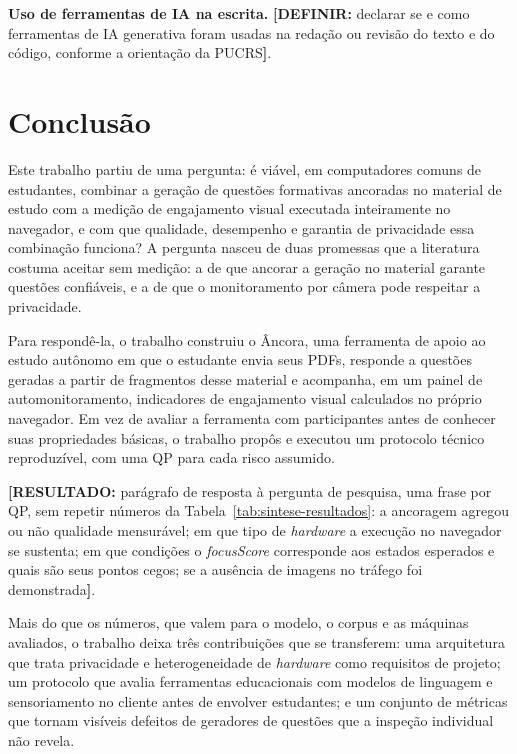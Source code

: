\documentclass[portuguese,oneside]{tcc}
\newcommand{\ferramenta}{Âncora\xspace}
\newcommand{\estr}[1]{\emph{#1}}
\newcommand{\fs}{\emph{focusScore}\xspace}
\newcommand{\resultado}[1]{\textcolor{red!70!black}{\textbf{[RESULTADO:} #1\textbf{]}}}
\newcommand{\definir}[1]{\textcolor{orange!75!black}{\textbf{[DEFINIR:} #1\textbf{]}}}
\begin{document}
\textbf{Uso de ferramentas de IA na escrita.} \definir{declarar se e como ferramentas de IA generativa foram usadas na redação ou revisão do texto e do código, conforme a orientação da PUCRS}.

\chapter{\label{chap:conclusao}Conclusão}

Este trabalho partiu de uma pergunta: é viável, em computadores comuns de estudantes, combinar a geração de questões formativas ancoradas no material de estudo com a medição de engajamento visual executada inteiramente no navegador, e com que qualidade, desempenho e garantia de privacidade essa combinação funciona? A pergunta nasceu de duas promessas que a literatura costuma aceitar sem medição: a de que ancorar a geração no material garante questões confiáveis, e a de que o monitoramento por câmera pode respeitar a privacidade.

Para respondê-la, o trabalho construiu o \ferramenta, uma ferramenta de apoio ao estudo autônomo em que o estudante envia seus PDFs, responde a questões geradas a partir de fragmentos desse material e acompanha, em um painel de automonitoramento, indicadores de engajamento visual calculados no próprio navegador. Em vez de avaliar a ferramenta com participantes antes de conhecer suas propriedades básicas, o trabalho propôs e executou um protocolo técnico reproduzível, com uma QP para cada risco assumido.

\resultado{parágrafo de resposta à pergunta de pesquisa, uma frase por QP, sem repetir números da Tabela~\ref{tab:sintese-resultados}: a ancoragem agregou ou não qualidade mensurável; em que tipo de \estr{hardware} a execução no navegador se sustenta; em que condições o \fs corresponde aos estados esperados e quais são seus pontos cegos; se a ausência de imagens no tráfego foi demonstrada}.

Mais do que os números, que valem para o modelo, o corpus e as máquinas avaliados, o trabalho deixa três contribuições que se transferem: uma arquitetura que trata privacidade e heterogeneidade de \estr{hardware} como requisitos de projeto; um protocolo que avalia ferramentas educacionais com modelos de linguagem e sensoriamento no cliente antes de envolver estudantes; e um conjunto de métricas que tornam visíveis defeitos de geradores de questões que a inspeção individual não revela.
\end{document}
